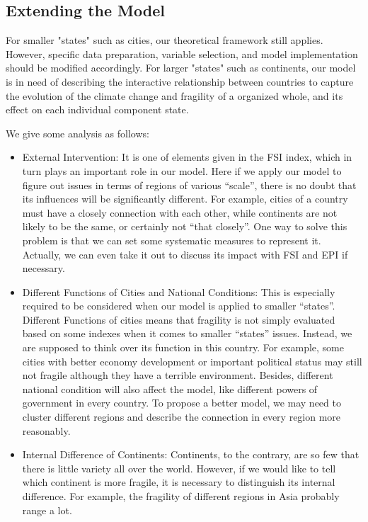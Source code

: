 \subsection{Extending the Model}

For smaller "states" such as cities, our theoretical framework still applies.
However, specific data preparation, variable selection, and model implementation should be modified accordingly. 
For larger "states" such as continents, our model is in need of describing the interactive relationship between countries to capture the evolution of the climate change and fragility of a organized whole, and its effect on each individual component state.

We give some analysis as follows:
\begin{itemize}
\item	External Intervention: 
It is one of elements given in the FSI index, which in turn plays an important role in our model. Here if we apply our model to figure out issues in terms of regions of various “scale”, there is no doubt that its influences will be significantly different. For example, cities of a country must have a closely connection with each other, while continents are not likely to be the same, or certainly not “that closely”.
One way to solve this problem is that we can set some systematic measures to represent it. Actually, we can even take it out to discuss its impact with FSI and EPI if necessary.
\item	Different Functions of Cities and National Conditions:
This is especially required to be considered when our model is applied to smaller “states”. Different Functions of cities means that fragility is not simply evaluated based on some indexes when it comes to smaller “states” issues. Instead, we are supposed to think over its function in this country. For example, some cities with better economy development or important political status may still not fragile although they have a terrible environment. Besides, different national condition will also affect the model, like different powers of government in every country.
To propose a better model, we may need to cluster different regions and describe the connection in every region more reasonably.
\item	Internal Difference of Continents:
Continents, to the contrary, are so few that there is little variety all over the world. However, if we would like to tell which continent is more fragile, it is necessary to distinguish its internal difference. For example, the fragility of different regions in Asia probably range a lot.
\end{itemize}

